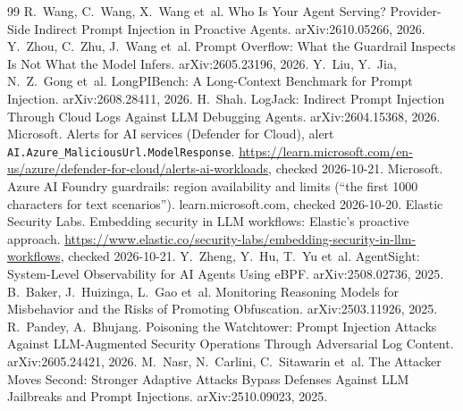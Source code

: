 \begin{thebibliography}{99}
 R.~Wang, C.~Wang, X.~Wang et~al. Who Is Your Agent Serving? Provider-Side Indirect Prompt Injection in Proactive Agents. arXiv:2610.05266, 2026.
 Y.~Zhou, C.~Zhu, J.~Wang et~al. Prompt Overflow: What the Guardrail Inspects Is Not What the Model Infers. arXiv:2605.23196, 2026.
 Y.~Liu, Y.~Jia, N.~Z.~Gong et~al. LongPIBench: A Long-Context Benchmark for Prompt Injection. arXiv:2608.28411, 2026.
 H.~Shah. LogJack: Indirect Prompt Injection Through Cloud Logs Against LLM Debugging Agents. arXiv:2604.15368, 2026.
 Microsoft. Alerts for AI services (Defender for Cloud), alert \texttt{AI.Azure\_MaliciousUrl.ModelResponse}. \url{https://learn.microsoft.com/en-us/azure/defender-for-cloud/alerts-ai-workloads}, checked 2026-10-21.
 Microsoft. Azure AI Foundry guardrails: region availability and limits (``the first 1000 characters for text scenarios''). learn.microsoft.com, checked 2026-10-20.
 Elastic Security Labs. Embedding security in LLM workflows: Elastic's proactive approach. \url{https://www.elastic.co/security-labs/embedding-security-in-llm-workflows}, checked 2026-10-21.
 Y.~Zheng, Y.~Hu, T.~Yu et~al. AgentSight: System-Level Observability for AI Agents Using eBPF. arXiv:2508.02736, 2025.
 B.~Baker, J.~Huizinga, L.~Gao et~al. Monitoring Reasoning Models for Misbehavior and the Risks of Promoting Obfuscation. arXiv:2503.11926, 2025.
 R.~Pandey, A.~Bhujang. Poisoning the Watchtower: Prompt Injection Attacks Against LLM-Augmented Security Operations Through Adversarial Log Content. arXiv:2605.24421, 2026.
 M.~Nasr, N.~Carlini, C.~Sitawarin et~al. The Attacker Moves Second: Stronger Adaptive Attacks Bypass Defenses Against LLM Jailbreaks and Prompt Injections. arXiv:2510.09023, 2025.
\end{thebibliography}
